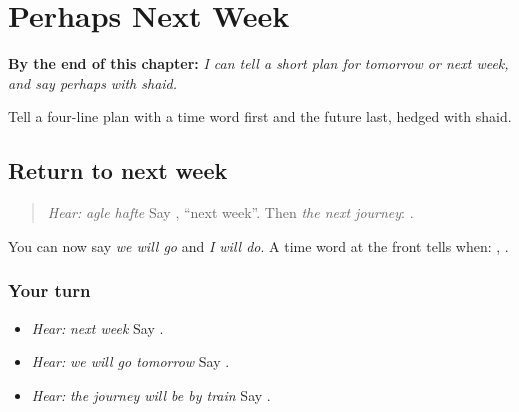 
\chapter{Perhaps Next Week}
\label{ch:pa-a2-plan}

\begin{chapteropening}
\textbf{By the end of this chapter:} \emph{I can tell a short plan for tomorrow or next week, and say perhaps with shaid.}

Tell a four-line plan with a time word first and the future last, hedged with shaid.
\end{chapteropening}

\section[\texorpdfstring{\pa{ਅਗਲੇ} \pa{ਹਫ਼ਤੇ} · \pa{ਅਗਲੀ} … (agle hafte …)}{ਅਗਲੇ ਹਫ਼ਤੇ · ਅਗਲੀ … (agle hafte …)}]{Return to next week}

\label{lesson:PA-C223-time-return}



\begin{quote}
\emph{Hear:} \emph{agle hafte} Say \textbf{ }, \textquotedblleft{}next week\textquotedblright{}. Then \emph{the next journey}: \textbf{ }.
\end{quote}

\begin{grammarlens}[title={Grammar Lens}]
You can now say \emph{we will go} and \emph{I will do}. A time word at the front tells when: \textbf{}, \textbf{ }.
\end{grammarlens}

\subsection*{Your turn}
\begin{itemize}
\raggedright
  \item \emph{Hear:} \emph{next week} Say \textbf{ }.
  \item \emph{Hear:} \emph{we will go tomorrow} Say \textbf{  }.
  \item \emph{Hear:} \emph{the journey will be by train} Say \textbf{   }.
\end{itemize}

